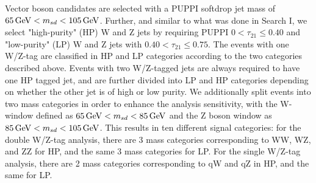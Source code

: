 Vector boson candidates are selected with a PUPPI softdrop jet mass of $65 \,\text{Ge\hspace{-.08em}V} < m_{sd} <105 \,\text{Ge\hspace{-.08em}V}$. Further, and similar to what was done in Search I, we select "high-purity" (HP) W and Z jets by requiring PUPPI $0<\tau_{21} \leq 0.40$ and "low-purity" (LP) W and Z jets with $0.40<\tau_{21}\leq0.75$. The events with one W/Z-tag are classified in HP and LP categories according to the two categories described above. Events with two W/Z-tagged jets are always required to have one HP tagged jet, and are further divided into LP and HP categories depending on whether the other jet is of high or low purity. We additionally split events into two mass categories in order to enhance the analysis sensitivity, with the W-window defined as $65 \,\text{Ge\hspace{-.08em}V} < m_{sd} < 85 \,\text{Ge\hspace{-.08em}V}$ and the Z boson window as $85 \,\text{Ge\hspace{-.08em}V} < m_{sd} < 105 \,\text{Ge\hspace{-.08em}V}$. This results in ten different signal categories: for the double W/Z-tag analysis, there are 3 mass categories corresponding to WW, WZ, and ZZ for HP, and the same 3 mass categories for LP. For the single W/Z-tag analysis, there are 2 mass categories corresponding to qW and qZ in HP, and the same for LP.
\clearpage

